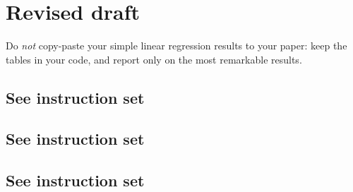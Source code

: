 %
%
%
\section{Revised draft}


  Do \emph{not} copy-paste your simple linear regression results to your paper: keep the tables in your code, and report only on the most remarkable results.%

	\subsection{See instruction set}

	\subsection{See instruction set}

	\subsection{See instruction set}